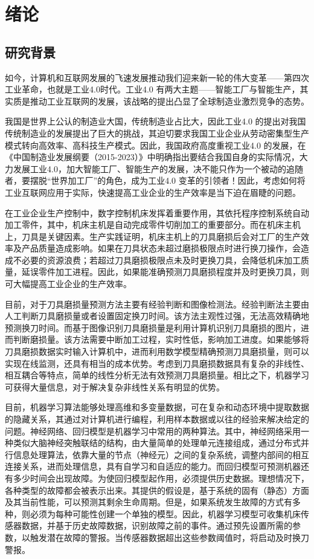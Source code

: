 \chapter{绪论}
\section{研究背景}
如今，计算机和互联网发展的飞速发展推动我们迎来新一轮的伟大变革——第四次工业革命，也就是工业4.0时代。工业4.0 有两大主题——智能工厂与智能生产，其实质是推动工业互联网的发展，该战略的提出凸显了全球制造业激烈竞争的态势。\par
我国是世界上公认的制造业大国，传统制造业占比大，因此工业4.0 的提出对我国传统制造业的发展提出了巨大的挑战，其迫切要求我国工业企业从劳动密集型生产模式转向高效率、高科技生产模式。因此，我国政府高度重视工业4.0 的发展，在《中国制造业发展纲要（2015-2023）》中明确指出要结合我国自身的实际情况，大力发展工业4.0，加大智能工厂、智能生产的发展，决不能只作为一个被动的追随者，要摆脱“世界加工厂”的角色，成为工业4.0 变革的引领者！因此，考虑如何将工业互联网应用于实际，快速提高工业企业的生产效率是当下迫在眉睫的问题。\par
在工业企业生产控制中，数字控制机床发挥着重要作用，其依托程序控制系统自动加工零件，其中，机床主机是自动完成零件切削加工的重要部分。而在机床主机上，刀具是关键因素。生产实践证明，机床主机上的刀具磨损后会对工厂的生产效率及产品质量造成影响。如果在刀具状态未超过磨损极限点时进行换刀操作，会造成不必要的资源浪费；若超过刀具磨损极限点未及时更换刀具，会降低机床加工质量，延误零件加工进程。因此，如果能准确预测刀具磨损程度并及时更换刀具，则可大幅提高工业企业的生产效率。\par
目前，对于刀具磨损量预测方法主要有经验判断和图像检测法。经验判断法主要由人工判断刀具磨损量或者设置固定换刀时间。该方法主观性过强，无法高效精确地预测换刀时间。而基于图像识别刀具磨损量是利用计算机识别刀具磨损的图片，进而判断磨损量。该方法需要中断加工过程，实时性低，影响加工进度。如果能够将刀具磨损数据实时输入计算机中，进而利用数学模型精确预测刀具磨损量，则可以实现在线监测，还具有相当的成本优势。考虑到刀具磨损数据具有复杂的非线性、相互耦合等特点，简单的线性分析无法有效预测刀具磨损量。相比之下，机器学习可获得大量信息，对于解决复杂非线性关系有明显的优势。\par
目前，机器学习算法能够处理高维和多变量数据，可在复杂和动态环境中提取数据的隐藏关系，其通过对计算机进行编程，利用样本数据或以往的经验来解决给定的问题。神经网络、回归模型是机器学习中常用的两种算法。其中，神经网络采用一种类似大脑神经突触联结的结构，由大量简单的处理单元连接组成，通过分布式并行信息处理算法，依靠大量的节点（神经元）之间的复杂系统，调整内部间的相互连接关系，进而处理信息，具有自学习和自适应的能力。而回归模型可预测机器还有多少时间会出现故障。为使回归模型起作用，必须提供历史数据。理想情况下，各种类型的故障都会被表示出来。其提供的假设是，基于系统的固有（静态）方面及其当前性能，可以预测其剩余生命周期。但是，如果系统发生故障的方式有多种，则必须为每种可能性创建一个单独的模型。因此，机器学习模型可收集机床传感器数据，并基于历史故障数据，识别故障之前的事件。通过预先设置所需的参数，以触发潜在故障的警报。当传感器数据超出这些参数阈值时，将启动及时换刀警报。\par

